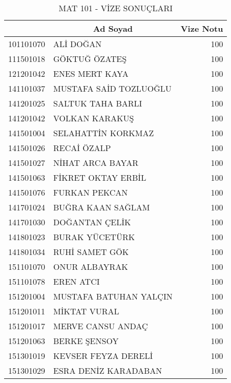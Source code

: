 \documentclass[12pt]{article}
\begin{document}
    \begin{longtable}{||r||l||r||}
    \caption{MAT 101 - VİZE SONUÇLARI}\\
    \toprule
    \toprule
    \rowcolor[rgb]{ 1,  .8,  1} \multicolumn{1}{||c||}{\textbf{Öğrenci No}} & \multicolumn{1}{c||}{\textbf{Ad Soyad}} & \multicolumn{1}{c||}{\textbf{Vize Notu}} \\
    \midrule
    \midrule\endhead
    101101070 & ALİ DOĞAN & 100 \\
    \midrule
    111501018 & GÖKTUĞ ÖZATEŞ & 100 \\
    \midrule
    121201042 & ENES MERT KAYA & 100 \\
    \midrule
    141101037 & MUSTAFA SAİD TOZLUOĞLU & 100 \\
    \midrule
    141201025 & SALTUK TAHA BARLI & 100 \\
    \midrule
    141201042 & VOLKAN KARAKUŞ & 100 \\
    \midrule
    141501004 & SELAHATTİN KORKMAZ & 100 \\
    \midrule
    141501026 & RECAİ ÖZALP & 100 \\
    \midrule
    141501027 & NİHAT ARCA BAYAR & 100 \\
    \midrule
    141501063 & FİKRET OKTAY ERBİL & 100 \\
    \midrule
    141501076 & FURKAN PEKCAN & 100 \\
    \midrule
    141701024 & BUĞRA KAAN SAĞLAM & 100 \\
    \midrule
    141701030 & DOĞANTAN ÇELİK & 100 \\
    \midrule
    141801023 & BURAK YÜCETÜRK & 100 \\
    \midrule
    141801034 & RUHİ SAMET GÖK & 100 \\
    \midrule
    151101070 & ONUR ALBAYRAK & 100 \\
    \midrule
    151101078 & EREN ATCI & 100 \\
    \midrule
    151201004 & MUSTAFA BATUHAN YALÇIN & 100 \\
    \midrule
    151201011 & MİKTAT VURAL & 100 \\
    \midrule
    151201017 & MERVE CANSU ANDAÇ & 100 \\
    \midrule
    151201063 & BERKE ŞENSOY & 100 \\
    \midrule
    151301019 & KEVSER FEYZA DERELİ & 100 \\
    \midrule
    151301029 & ESRA DENİZ KARADABAN & 100 \\

\end{longtable}
\end{document}
